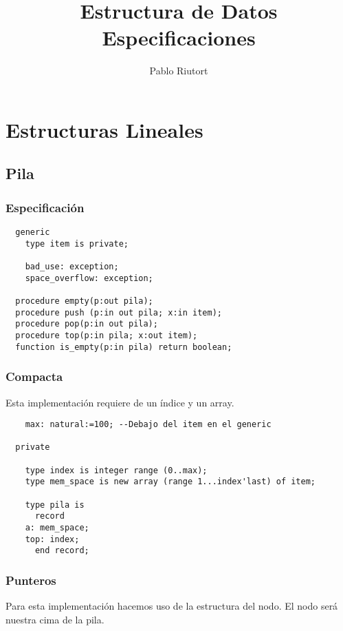 \documentclass[a4paper,10pt]{book}
\author{Pablo Riutort}
\title{\Huge{Estructura de Datos}\\\vspace{1cm} \Huge{\textbf{Especificaciones}}}
\begin{document}
\maketitle
\pagebreak
\tableofcontents


\lstset{basicstyle=\footnotesize\ttfamily,breaklines=true}
\lstset{framextopmargin=50pt,frame=bottomline}

\chapter{Estructuras Lineales}

\section{Pila}
\subsection{Especificación}

\begin{lstlisting}
  generic
    type item is private;
    
    bad_use: exception;
    space_overflow: exception;
    
  procedure empty(p:out pila);
  procedure push (p:in out pila; x:in item);
  procedure pop(p:in out pila);
  procedure top(p:in pila; x:out item);
  function is_empty(p:in pila) return boolean;
\end{lstlisting}

\subsection{Compacta}
Esta implementación requiere de un índice y un array.
\begin{lstlisting}
    max: natural:=100; --Debajo del item en el generic
    
  private
  
    type index is integer range (0..max);
    type mem_space is new array (range 1...index'last) of item;
    
    type pila is
      record
	a: mem_space;
	top: index;
      end record;
\end{lstlisting}

\pagebreak

\subsection{Punteros}
Para esta implementación hacemos uso de la estructura del nodo. El nodo será nuestra cima de la pila.\\\
\end{document}
